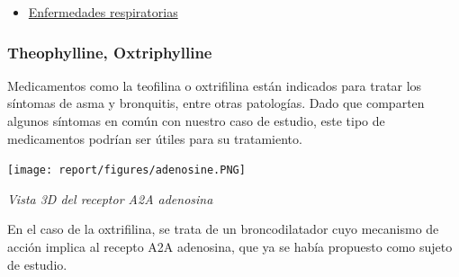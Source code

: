 \begin{itemize}
    \item \underline{Enfermedades respiratorias}
\end{itemize}


\subsubsection{Theophylline, Oxtriphylline}

Medicamentos como la teofilina o oxtrifilina están indicados para tratar los síntomas de asma y bronquitis, entre otras patologías.
Dado que comparten algunos síntomas en común con nuestro caso de estudio, este tipo de medicamentos podrían ser útiles para su tratamiento.

\begin{center}

\texttt{[image: report/figures/adenosine.PNG]}


\caption{\textit{Vista 3D del receptor A2A adenosina}}

\end{center}

En el caso de la oxtrifilina, se trata de un broncodilatador cuyo mecanismo de acción implica al recepto A2A adenosina, que ya se había propuesto como sujeto de estudio.
\cite{Abouelkhair2020TargetingHypothesis}

